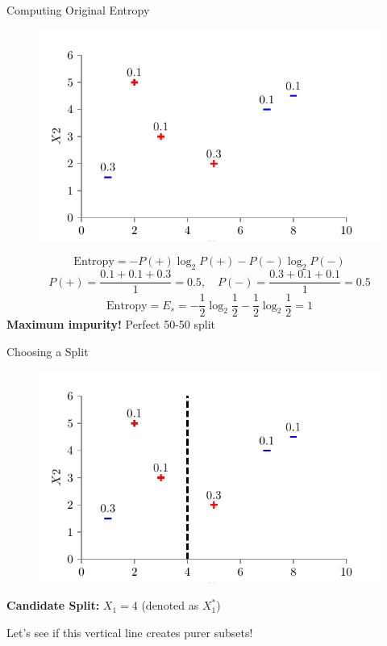 \documentclass[usenames,dvipsnames]{beamer}
\begin{document}
\begin{frame}{Computing Original Entropy}
\begin{figure}
    \centering
    \includegraphics[scale=0.8]{../assets/decision-trees/figures/dt_weighted/fig2.pdf}
\end{figure}
\small
$$\text{Entropy} = -P(+) \log_2 P(+) - P(-) \log_2 P(-)$$
$$P(+) = \frac{0.1 + 0.1 + 0.3}{1} = 0.5, \quad P(-) = \frac{0.3 + 0.1 + 0.1}{1} = 0.5$$
$$\text{Entropy} = E_s = -\frac{1}{2} \log_2 \frac{1}{2} - \frac{1}{2} \log_2 \frac{1}{2} = 1$$
\textbf{Maximum impurity!} Perfect 50-50 split
\end{frame}
	
\begin{frame}{Choosing a Split}
\begin{figure}
    \centering
    \includegraphics[scale=0.7]{../assets/decision-trees/figures/dt_weighted/fig3.pdf}
\end{figure}
\textbf{Candidate Split:} $X_1 = 4$ (denoted as $X_1^*$)

Let's see if this vertical line creates purer subsets!
\end{frame}
		
\end{document}
